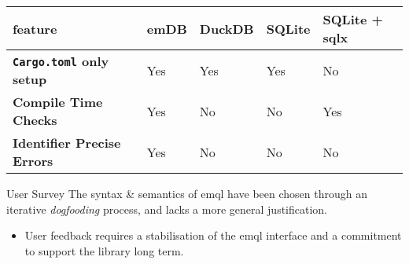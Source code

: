 \begin{center}
    \begin{tabular}{l | l l l l }
        \textbf{feature}                                  & \textbf{emDB} & \textbf{DuckDB} & \textbf{SQLite} & \textbf{SQLite + sqlx} \\
        \hline
        \textbf{\texttt{Cargo.toml} only setup} & Yes           & Yes             & Yes             & No                     \\
        \textbf{Compile Time Checks}                      & Yes           & No              & No              & Yes                    \\
        \textbf{Identifier Precise Errors}                & Yes           & No              & No              & No                     \\
    \end{tabular}
\end{center}

\begin{futurebox}{User Survey}
    The syntax \& semantics of emql have been chosen through an iterative \textit{dogfooding} process, and lacks a more general justification.
    \begin{itemize}
        \setlength\itemsep{0em}
        \item User feedback requires a stabilisation of the emql interface and a commitment to support the library long term.
    \end{itemize}
\end{futurebox}
